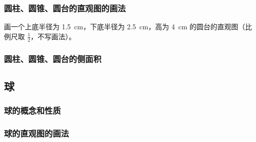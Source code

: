 \subsubsection{圆柱、圆锥、圆台的直观图的画法}
\begin{Practice}
  画一个上底半径为 \qty{1.5}{cm}，下底半径为 \qty{2.5}{cm}，高为 \qty{4}{cm} 的圆台的直观图（比例尺取 $\frac{1}{2}$，不写画法）。
\end{Practice}
\subsubsection{圆柱、圆锥、圆台的侧面积}
\begin{Practice}
  \begin{question}
    \item 
    \item 
    \item 
  \end{question}
\end{Practice}

\begin{Exercise}
  \begin{question}
    \item 
    \item 
    \item 
    \item 
    \item 
    \item 
    \item 
    \item 
    \item 
    \item 
    \item 
    \item 
    \item 
    \item 
  \end{question}
\end{Exercise}

\subsection{球}
\subsubsection{球的概念和性质}
\subsubsection{球的直观图的画法}
